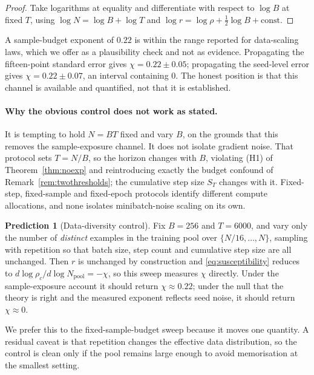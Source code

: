 \documentclass{article}
\theoremstyle{plain}
\theoremstyle{definition}
\newtheorem{prediction}{Prediction}
\theoremstyle{remark}
\newcommand{\1}{\mathbf{1}}
\begin{document}
\begin{proof}
Take logarithms at equality and differentiate with respect to $\log B$ at fixed
$T$, using $\log N = \log B+\log T$ and
$\log r = \log\rho+\tfrac12\log B+\mathrm{const}$.
\end{proof}

A sample-budget exponent of $0.22$ is within the range reported for data-scaling
laws, which we offer as a plausibility check and not as evidence. Propagating the
fifteen-point standard error gives $\chi = 0.22\pm0.05$; propagating the
seed-level error gives $\chi = 0.22\pm0.07$, an interval containing $0$. The
honest position is that this channel is available and quantified, not that it is
established.

\paragraph{Why the obvious control does not work as stated.}
It is tempting to hold $N = BT$ fixed and vary $B$, on the grounds that this
removes the sample-exposure channel. It does not isolate gradient noise. That
protocol sets $T = N/B$, so the horizon changes with $B$, violating (H1) of
Theorem~\ref{thm:noexp} and reintroducing exactly the budget confound of
Remark~\ref{rem:twothresholds}; the cumulative step size $S_T$ changes with it.
Fixed-step, fixed-sample and fixed-epoch protocols identify different compute
allocations, and none isolates minibatch-noise scaling on its own.

\begin{prediction}[Data-diversity control]
\label{pred:diversity}
Fix $B = 256$ and $T = 6000$, and vary only the number of \emph{distinct}
examples in the training pool over $\{N/16,\dots,N\}$, sampling with repetition
so that batch size, step count and cumulative step size are all unchanged. Then
$r$ is unchanged by construction and \eqref{eq:susceptibility} reduces to
$d\log\rho_c/d\log N_{\mathrm{pool}} = -\chi$, so this sweep measures $\chi$
directly. Under the sample-exposure account it should return $\chi\approx0.22$;
under the null that the theory is right and the measured exponent reflects seed
noise, it should return $\chi\approx0$.
\end{prediction}

We prefer this to the fixed-sample-budget sweep because it moves one quantity. A
residual caveat is that repetition changes the effective data distribution, so
the control is clean only if the pool remains large enough to avoid memorisation
at the smallest setting.
\end{document}
